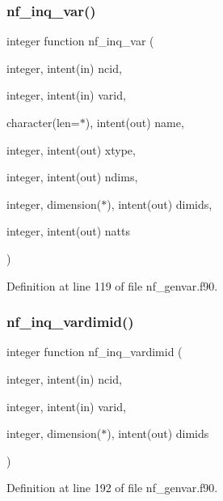 \subsubsection{\texorpdfstring{nf\+\_\+inq\+\_\+var()}{nf\_inq\_var()}}
{\footnotesize\ttfamily integer function nf\+\_\+inq\+\_\+var (\begin{DoxyParamCaption}\item[{integer, intent(in)}]{ncid,  }\item[{integer, intent(in)}]{varid,  }\item[{character(len=$\ast$), intent(out)}]{name,  }\item[{integer, intent(out)}]{xtype,  }\item[{integer, intent(out)}]{ndims,  }\item[{integer, dimension($\ast$), intent(out)}]{dimids,  }\item[{integer, intent(out)}]{natts }\end{DoxyParamCaption})}



Definition at line 119 of file nf\+\_\+genvar.\+f90.

\mbox{\label{nf__genvar_8f90_a0272c24bf5b50b1e7e0972937967ae0b}} 
\subsubsection{\texorpdfstring{nf\+\_\+inq\+\_\+vardimid()}{nf\_inq\_vardimid()}}
{\footnotesize\ttfamily integer function nf\+\_\+inq\+\_\+vardimid (\begin{DoxyParamCaption}\item[{integer, intent(in)}]{ncid,  }\item[{integer, intent(in)}]{varid,  }\item[{integer, dimension($\ast$), intent(out)}]{dimids }\end{DoxyParamCaption})}



Definition at line 192 of file nf\+\_\+genvar.\+f90.

\mbox{\label{nf__genvar_8f90_ac66a3256fad322f32801ecddd81a58db}} 
